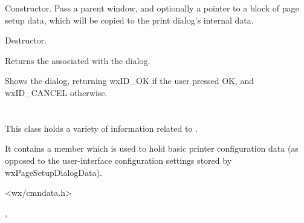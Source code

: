 Constructor. Pass a parent window, and optionally a pointer to a block of page setup
data, which will be copied to the print dialog's internal data.

\label{wxpagesetupdialogdtor}


Destructor.

\label{wxpagesetupdialoggetpagesetupdata}


Returns the  associated with the dialog.

%
%

\label{wxpagesetupdialogshowmodal}


Shows the dialog, returning wxID\_OK if the user pressed OK, and wxID\_CANCEL
otherwise.

\section{}\label{wxpagesetupdialogdata}

This class holds a variety of information related to .

It contains a  member which is used to hold basic printer configuration data (as opposed to the
user-interface configuration settings stored by wxPageSetupDialogData).




<wx/cmndata.h>




, 

